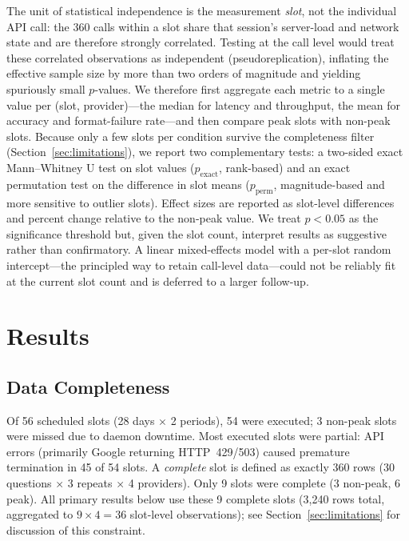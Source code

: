 \documentclass[11pt]{article}
\begin{document}
The unit of statistical independence is the measurement \emph{slot}, not the individual
API call: the 360 calls within a slot share that session's server-load and network state
and are therefore strongly correlated. Testing at the call level would treat these
correlated observations as independent (pseudoreplication), inflating the effective sample
size by more than two orders of magnitude and yielding spuriously small $p$-values.
We therefore first aggregate each metric to a single value per (slot, provider)---the
median for latency and throughput, the mean for accuracy and format-failure rate---and
then compare peak slots with non-peak slots.
Because only a few slots per condition survive the completeness filter
(Section~\ref{sec:limitations}), we report two complementary tests: a two-sided exact
Mann--Whitney U test on slot values ($p_\text{exact}$, rank-based) and an exact permutation
test on the difference in slot means ($p_\text{perm}$, magnitude-based and more sensitive
to outlier slots). Effect sizes are reported as slot-level differences and percent change
relative to the non-peak value. We treat $p < 0.05$ as the significance threshold but,
given the slot count, interpret results as suggestive rather than confirmatory.
A linear mixed-effects model with a per-slot random intercept---the principled way to
retain call-level data---could not be reliably fit at the current slot count and is
deferred to a larger follow-up.

\section{Results}

\subsection{Data Completeness}

Of 56 scheduled slots (28 days $\times$ 2 periods), 54 were executed; 3 non-peak slots
were missed due to daemon downtime.
Most executed slots were partial: API errors (primarily Google returning HTTP~429/503)
caused premature termination in 45 of 54 slots.
A \emph{complete} slot is defined as exactly 360 rows
(30 questions $\times$ 3 repeats $\times$ 4 providers).
Only 9 slots were complete (3 non-peak, 6 peak).
All primary results below use these 9 complete slots (3,240 rows total, aggregated to
$9 \times 4 = 36$ slot-level observations);
see Section~\ref{sec:limitations} for discussion of this constraint.
\end{document}
